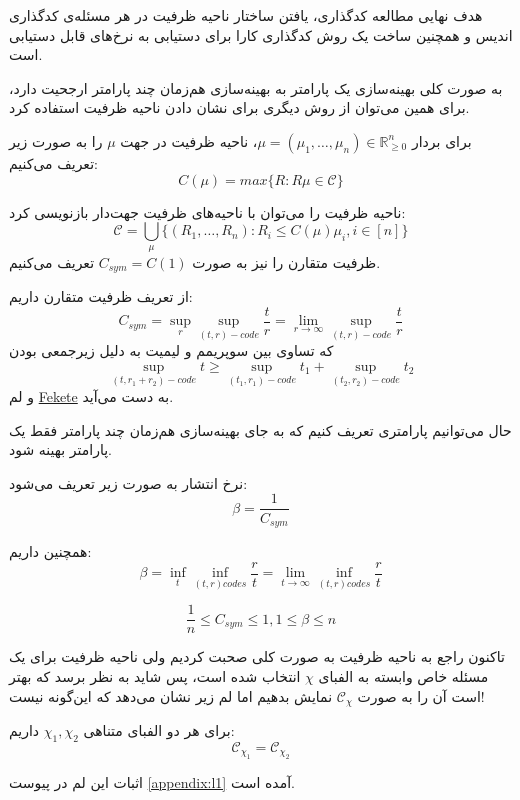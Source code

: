 	هدف نهایی مطالعه کدگذاری، یافتن ساختار ناحیه ظرفیت در هر مسئله‌ی کدگذاری اندیس و همچنین ساخت یک روش کدگذاری کارا برای دستیابی به نرخ‌های قابل دستیابی است.
	
	به صورت کلی بهینه‌سازی یک پارامتر به بهینه‌سازی هم‌زمان چند پارامتر ارجحیت دارد، برای همین می‌توان از روش دیگری برای نشان دادن ناحیه ظرفیت استفاده کرد.
	\begin{definition}
	برای بردار
	$\mu = (\mu_1, \ldots, \mu_n) \in \mathbb{R}_{\geqslant 0}^n $،
    ناحیه ظرفیت در جهت
	$\mu$
	را به صورت زیر تعریف می‌کنیم:
	$$C(\mu) = max \{R: R \mu \in \mathscr{C}\}$$
\end{definition}

\begin{remark}
	ناحیه ظرفیت را می‌توان با ناحیه‌های ظرفیت جهت‌دار بازنویسی کرد:
	$$\mathscr{C} = \bigcup\limits_{\mu} \{(R_1, \ldots, R_n): R_i \leq C(\mu) \mu_i, i \in [n]\}$$
	ظرفیت متقارن را نیز به صورت
	$C_{sym} = C(1) $
	 تعریف می‌کنیم.
\end{remark}

از تعریف ظرفیت متقارن داریم:
$$C_{sym}= \sup\limits_{r} \sup_{(t, r)-code} \dfrac{t}{r} = \lim\limits_{r \rightarrow \infty} \sup_{(t, r)-code} \dfrac{t}{r} $$
که تساوی بین سوپریمم و لیمیت به دلیل زیرجمعی بودن
$$\sup_{(t, r_1 + r_2)-code} t \geqslant \sup_{(t_1, r_1)-code} t_1 + \sup_{(t_2, r_2)-code} t_2$$
و لم
\href{https://en.wikipedia.org/wiki/Subadditivity}{Fekete}
به دست می‌آید.

حال می‌توانیم پارامتری تعریف کنیم که به جای بهینه‌سازی هم‌زمان چند پارامتر فقط یک پارامتر بهینه شود.
\begin{definition}
	نرخ انتشار به صورت زیر تعریف می‌شود:
	$$\beta = \dfrac{1}{C_{sym}}$$
\end{definition}
همچنین داریم:
$$\beta = \inf\limits_{t} \inf\limits_{(t, r) codes} \dfrac{r}{t} = \lim\limits_{t \rightarrow \infty} \inf\limits_{(t, r) codes} \dfrac{r}{t}$$

\begin{remark}
	$$\dfrac{1}{n} \leq C_{sym} \leq 1, 1 \leq \beta \leq n$$
\end{remark}
تاکنون راجع به ناحیه ظرفیت به صورت کلی صحبت کردیم ولی ناحیه ظرفیت برای یک مسئله خاص وابسته به الفبای
$\chi$
انتخاب شده است، پس شاید به نظر برسد که بهتر است آن را به صورت
$\mathscr{C}_\chi$
نمایش بدهیم اما لم زیر نشان می‌دهد که این‌گونه نیست!
\begin{lemma}
	برای هر دو الفبای متناهی
	$\chi_1, \chi_2$
	داریم:
	$$\mathscr{C}_{\chi_1 }= \mathscr{C}_{\chi_2} $$
\end{lemma}
اثبات این لم در پیوست
\autoref{appendix:l1}
 آمده است.

